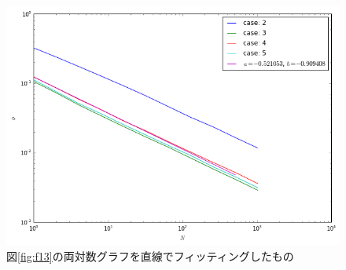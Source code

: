 \begin{figure}[H]
    \begin{center}
        \includegraphics[width=12.5cm]{../img/simple3_N_2_fit.png}
        \caption{図\ref{fig:f13}の両対数グラフを直線でフィッティングしたもの}
        \label{fig:f14}
    \end{center}
\end{figure}
